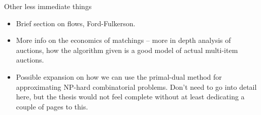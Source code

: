 \documentclass[11pt]{article}
\renewcommand{\'}{^{'}}
\begin{document}
\begin{section}{Other less immediate things}
	\begin{itemize}
		\item Brief section on flows, Ford-Fulkerson.
		\item More info on the economics of matchings -- more in depth analysis of auctions, 
			how the algorithm given is a good model of actual multi-item auctions.
		\item Possible expansion on how we can use the primal-dual method for approximating 
			NP-hard combinatorial problems. Don't need to go into detail here, but the 
			thesis would not feel complete without at least dedicating a couple of pages 
			to this.
	\end{itemize}
\end{section}
\end{document}
